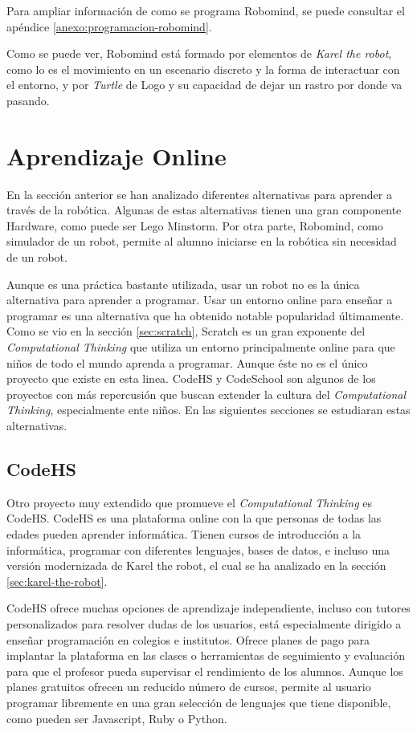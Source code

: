 {{{\color{blue}
Para ampliar información de como se programa Robomind, se puede consultar el apéndice \ref{anexo:programacion-robomind}.

Como se puede ver, Robomind está formado por elementos de \emph{Karel the robot}, como lo es el movimiento en un escenario discreto y la forma de interactuar con el entorno, y por \emph{Turtle} de Logo y su capacidad de dejar un rastro por donde va pasando.
}


\section{Aprendizaje Online}
\label{sec:aprendiendo-online}

En la sección anterior se han analizado diferentes alternativas para aprender a través de la robótica. Algunas de estas alternativas tienen una gran componente Hardware, como puede ser Lego Minstorm. Por otra parte, Robomind, como simulador de un robot, permite al alumno iniciarse en la robótica sin necesidad  de un robot. 

Aunque es una práctica bastante utilizada, usar un robot no es la única alternativa para aprender a programar. Usar un entorno online para enseñar a programar es una alternativa que ha obtenido notable popularidad últimamente. Como se vio en la sección \ref{sec:scratch}, Scratch es un gran exponente del \emph{Computational Thinking} que utiliza un entorno principalmente online para que niños de todo el mundo aprenda a programar. Aunque éste no es el único proyecto que existe en esta linea. CodeHS y CodeSchool son algunos de los proyectos con más repercusión que buscan extender la cultura del \emph{Computational Thinking}, especialmente ente niños. En las siguientes secciones se estudiaran estas alternativas.

\subsection{CodeHS}
\label{sec:CodeHS}


Otro proyecto muy extendido que promueve el \emph{Computational Thinking} es CodeHS. CodeHS es una plataforma online con la que personas de todas las edades pueden aprender informática. Tienen cursos de introducción a la informática, programar con diferentes lenguajes, bases de datos, e incluso una versión modernizada de Karel the robot, el cual se ha analizado en la sección \ref{sec:karel-the-robot}.

CodeHS ofrece muchas opciones de aprendizaje independiente, incluso con tutores personalizados para resolver dudas de los usuarios, está especialmente dirigido a enseñar programación en colegios e institutos. Ofrece planes de pago para implantar la plataforma en las clases o herramientas de seguimiento y evaluación para que el profesor pueda supervisar el rendimiento de los alumnos. Aunque los planes gratuitos ofrecen un reducido número de cursos, permite al usuario programar libremente en una gran selección de lenguajes que tiene disponible, como pueden ser Javascript, Ruby o Python.


}}
